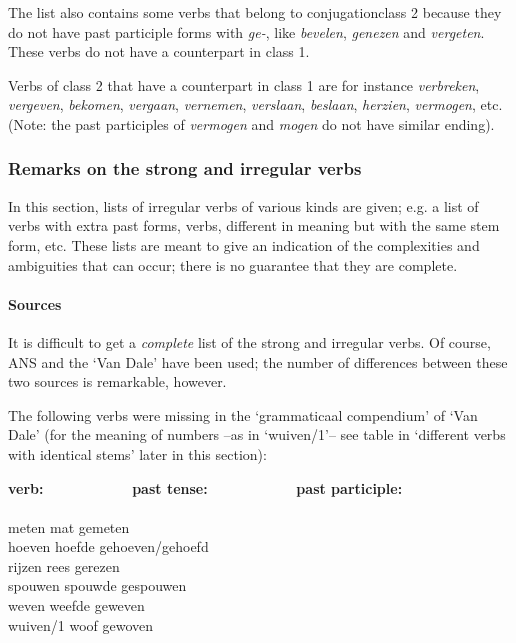 The list also contains 
some verbs that belong to conjugationclass 2 because they do not have
past participle forms with {\em ge-}, like {\em bevelen}, {\em genezen}
and {\em vergeten}. These verbs do not have a counterpart in class 1.

Verbs of class 2 that have a counterpart in class 1 are for instance 
{\em verbreken},
{\em vergeven}, {\em bekomen}, {\em vergaan}, 
{\em vernemen}, {\em verslaan}, {\em beslaan}, {\em herzien},
{\em vermogen}, etc. (Note: the past participles of {\em vermogen} and 
{\em mogen} do not have similar ending).



\subsubsection{Remarks on the strong and irregular verbs}

In this section, lists of irregular verbs of various kinds are given; e.g. a 
list of verbs with extra past forms, verbs, different in meaning but 
with the same stem form, etc. These lists are meant to give an indication of 
the complexities and ambiguities that can occur; there is no guarantee that 
they are complete.

\paragraph{Sources}

It is difficult to get a {\em complete} list of the strong and irregular verbs.
Of course, ANS and the `Van Dale' have been used; the number of differences
between these two sources is remarkable, however.

The following verbs were missing in the `grammaticaal compendium' of `Van 
Dale' (for the meaning of numbers --as in `wuiven/1'-- see table in 
`different verbs with identical stems' later in this section):

\begin{tabbing}
{\bf verb:}   \ \ \ \ \ \ \ \ \ \ \ \     \=   
{\bf past tense:}  \ \ \ \ \ \ \ \ \ \ \ \    \=    
{\bf past participle:}  \ \ \ \ \ \ \ \ \ \ \ \   \\
             \>               \>                               \\
meten        \>   mat         \>    gemeten                    \\
hoeven       \>   hoefde      \>    gehoeven/gehoefd           \\
rijzen       \>   rees        \>    gerezen                    \\
spouwen      \>   spouwde     \>    gespouwen                  \\
weven        \>   weefde      \>    geweven                    \\
wuiven/1     \>   woof        \>    gewoven                    \\
\end{tabbing}

